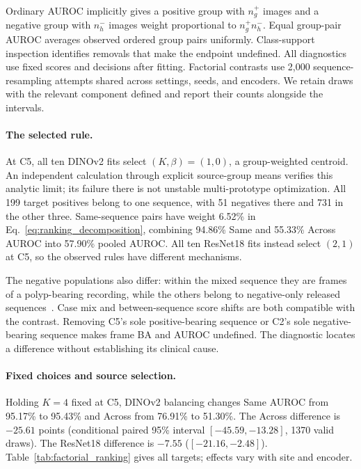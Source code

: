 Ordinary AUROC implicitly gives a positive group with $n_g^+$ images and a negative group with $n_h^-$ images weight proportional to $n_g^+n_h^-$. Equal group-pair AUROC averages observed ordered group pairs uniformly. Class-support inspection identifies removals that make the endpoint undefined. All diagnostics use fixed scores and decisions after fitting. Factorial contrasts use 2,000 sequence-resampling attempts shared across settings, seeds, and encoders. We retain draws with the relevant component defined and report their counts alongside the intervals.




\paragraph{The selected rule.}
At C5, all ten DINOv2 fits select $(K,\beta)=(1,0)$, a group-weighted centroid. An independent calculation through explicit source-group means verifies this analytic limit; its failure there is not unstable multi-prototype optimization. All 199 target positives belong to one sequence, with 51 negatives there and 731 in the other three. Same-sequence pairs have weight 6.52\% in Eq.~\ref{eq:ranking_decomposition}, combining 94.86\% Same and 55.33\% Across AUROC into 57.90\% pooled AUROC. All ten ResNet18 fits instead select $(2,1)$ at C5, so the observed rules have different mechanisms.

The negative populations also differ: within the mixed sequence they are frames of a polyp-bearing recording, while the others belong to negative-only released sequences~\cite{ali2023polypgen}. Case mix and between-sequence score shifts are both compatible with the contrast. Removing C5's sole positive-bearing sequence or C2's sole negative-bearing sequence makes frame BA and AUROC undefined. The diagnostic locates a difference without establishing its clinical cause.


\paragraph{Fixed choices and source selection.}
Holding $K=4$ fixed at C5, DINOv2 balancing changes Same AUROC from 95.17\% to 95.43\% and Across from 76.91\% to 51.30\%. The Across difference is $-25.61$ points (conditional paired 95\% interval $[-45.59,-13.28]$, 1370 valid draws). The ResNet18 difference is $-7.55$ ($[-21.16,-2.48]$). Table~\ref{tab:factorial_ranking} gives all targets; effects vary with site and encoder.

